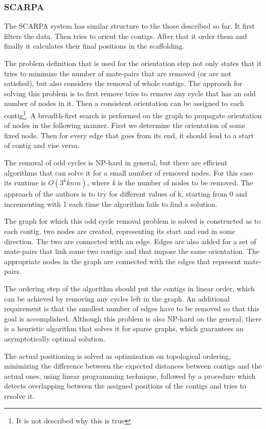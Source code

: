 \documentclass[11pt]{article}
\begin{document}
\subsubsection{SCARPA} %
\label{ssub:SCARPA}
The SCARPA system has similar structure to the those described so far. It first
filters the data. Then tries to orient the contigs. After that it order them and
finally it calculates their final positions in the scaffolding. 

The problem definition that is used for the orientation step not only states
that it tries to minimize the number of mate-pairs that are removed (or are not
satisfied), but also considers the removal of whole contigs. The approach for
solving this problem is to first remove tries to remove any cycle that has an
odd number of nodes in it. Then a consistent orientation can be assigned to each
contig\footnote{It is not described why this is true}. A breadth-first search is
performed on the graph to propagate orientation of nodes in the following
manner. First we determine the orientation of some fixed node. Then for every
edge that goes from its end, it should lead to a start of contig and vise versa.

The removal of odd cycles is NP-hard in general, but there are efficient
algorithms that can solve it for a small number of removed nodes. For this case
its runtime is $O(3^k k n m )$, where \emph{k} is the number of nodes to be
removed. The approach of the authors is to try for different values of k,
starting from 0 and incrementing with 1 each time the algorithm fails to find a
solution.

The graph for which this odd cycle removal problem is solved is constructed as
to each contig, two nodes are created, representing its start and end in some
direction. The two are connected with an edge. Edges are also added for a set of
mate-pairs that link some two contigs and that impose the same orientation. The
appropriate nodes in the graph are connected with the edges that represent
mate-pairs. 

The ordering step of the algorithm should put the contigs in linear order, which
can be achieved by removing any cycles left in the graph. An additional
requirement is that the smallest number of edges have to be removed so that this
goal is accomplished. Although this problem is also NP-hard on the general,
there is a heuristic algorithm that solves it for sparse graphs, which
guarantees an asymptotically optimal solution. 

The actual positioning is solved as optimization on topological ordering,
minimizing the difference between the expected distances between contigs and the
actual ones, using linear programming technique, followed by a procedure which
detects overlapping between the assigned positions of the contigs and tries to
resolve it.
\end{document}
